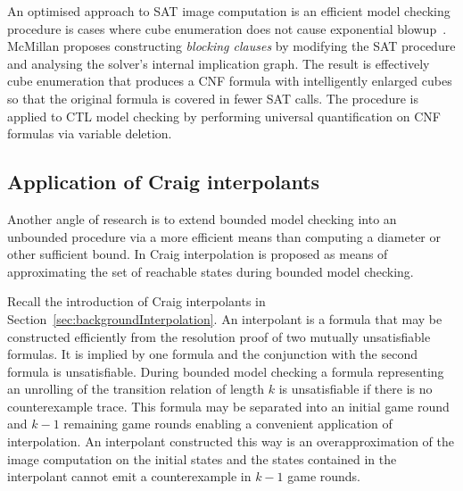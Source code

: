An optimised approach to SAT image computation is an efficient model checking procedure is cases where cube enumeration does not cause exponential blowup~\cite{McMillan02}. McMillan proposes constructing \emph{blocking clauses} by modifying the SAT procedure and analysing the solver's internal implication graph. The result is effectively cube enumeration that produces a CNF formula with intelligently enlarged cubes so that the original formula is covered in fewer SAT calls. The procedure is applied to CTL model checking by performing universal quantification on CNF formulas via variable deletion.

\subsection{Application of Craig interpolants}

Another angle of research is to extend bounded model checking into an unbounded procedure via a more efficient means than computing a diameter or other sufficient bound. In \cite{McMillan03} Craig interpolation is proposed as means of approximating the set of reachable states during bounded model checking. 

Recall the introduction of Craig interpolants in Section~\ref{sec:backgroundInterpolation}. An interpolant is a formula that may be constructed efficiently from the resolution proof of two mutually unsatisfiable formulas. It is implied by one formula and the conjunction with the second formula is unsatisfiable. During bounded model checking a formula representing an unrolling of the transition relation of length $k$ is unsatisfiable if there is no counterexample trace. This formula may be separated into an initial game round and $k-1$ remaining game rounds enabling a convenient application of interpolation. An interpolant constructed this way is an overapproximation of the image computation on the initial states and the states contained in the interpolant cannot emit a counterexample in $k-1$ game rounds.



